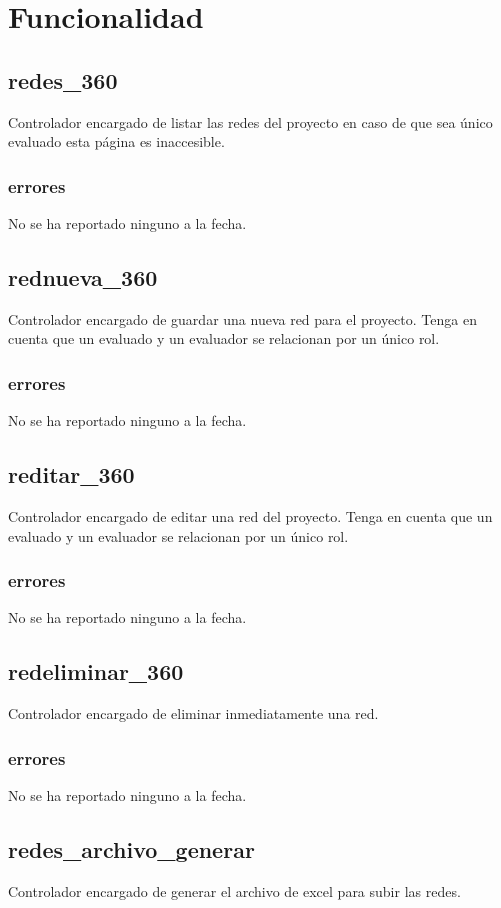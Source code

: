 \documentclass[10pt,a4paper]{book}
\begin{document}
	\section{Funcionalidad}

	\subsection{redes\_360}
	Controlador encargado de listar las redes del proyecto en caso de que sea único evaluado esta página es inaccesible. 
	\subsubsection{errores}
	No se ha reportado ninguno a la fecha.
	
	\subsection{rednueva\_360}
	Controlador encargado de guardar una nueva red para el proyecto. Tenga en cuenta que un evaluado y un evaluador se relacionan por un único rol.
	\subsubsection{errores}
	No se ha reportado ninguno a la fecha.
	
	\subsection{reditar\_360}
	Controlador encargado de editar una red del proyecto. Tenga en cuenta que un evaluado y un evaluador se relacionan por un único rol.
	\subsubsection{errores}
	No se ha reportado ninguno a la fecha.
	
	\subsection{redeliminar\_360}
	Controlador encargado de eliminar inmediatamente una red.
	\subsubsection{errores}
	No se ha reportado ninguno a la fecha.
	
	\subsection{redes\_archivo\_generar}
	Controlador encargado de generar el archivo de excel para subir las redes.
\end{document}
